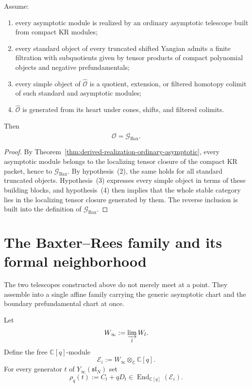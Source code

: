 \begin{theorem}
\ClaimStatusProvedHere
\label{thm:baxter-envelope-criterion}
Assume:
\begin{enumerate}
 \item every asymptotic module is realized by an ordinary asymptotic
 telescope built from compact KR modules;
 \item every standard object of every truncated shifted Yangian admits
 a finite filtration with subquotients given by tensor products of
 compact polynomial objects and negative prefundamentals;
 \item every simple object of $\widehat{\mathcal O}$ is a quotient,
 extension, or filtered homotopy colimit of such standard and
 asymptotic modules;
 \item $\widehat{\mathcal O}$ is generated from its heart under cones,
 shifts, and filtered colimits.
\end{enumerate}
Then
\begin{equation}
\widehat{\mathcal O}=\mathcal G_{\mathrm{Bax}}.
\end{equation}
\end{theorem}

\begin{proof}
By Theorem~\ref{thm:derived-realization-ordinary-asymptotic}, every
asymptotic module belongs to the localizing tensor closure of the compact
KR packet, hence to $\mathcal G_{\mathrm{Bax}}$. By hypothesis~(2), the
same holds for all standard truncated objects. Hypothesis~(3) expresses
every simple object in terms of these building blocks, and
hypothesis~(4) then implies that the whole stable category lies in the
localizing tensor closure generated by them. The reverse inclusion is
built into the definition of $\mathcal G_{\mathrm{Bax}}$.
\end{proof}

\section{The Baxter--Rees family and its formal neighborhood}
\label{sec:typeA-baxter-rees-family}

The two telescopes constructed above do not merely meet at a point. They
assemble into a single affine family carrying the generic asymptotic chart
and the boundary prefundamental chart at once.

\begin{definition}
\label{def:baxter-rees-family}
Let
\begin{equation}
W_\infty:=\varinjlim_l W_l.
\end{equation}
Define the free $\mathbb C[q]$-module
\begin{equation}
\mathcal E_i:=W_\infty\otimes_{\mathbb C}\mathbb C[q].
\end{equation}
For every generator $t$ of $Y_\infty(\mathfrak{sl}_N)$ set
\begin{equation}
\rho_q(t):=C_t+qD_t\in \operatorname{End}_{\mathbb C[q]}(\mathcal E_i).
\end{equation}
\end{definition}

